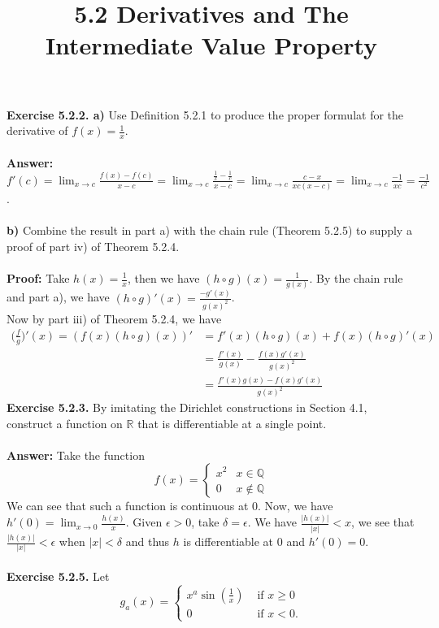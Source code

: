 \documentclass{article}
\title{\textbf{5.2 Derivatives and The Intermediate Value Property}}
\begin{document}
	\maketitle
	\textbf{Exercise 5.2.2. a)} Use Definition 5.2.1 to produce the proper formulat for the derivative of $f(x) = \frac{1}{x}$. \\ \\
	\textbf{Answer:} $f'(c) = \lim_{x \to c} \frac{f(x) - f(c)}{x - c} = \lim_{x \to c} \frac{\frac{1}{x} - \frac{1}{c}}{x - c} = \lim_{x \to c} \frac{c - x}{xc(x - c)} = \lim_{x \to c} \frac{-1}{xc} = \frac{-1}{c^2}$. \\ \\
	\textbf{b)} Combine the result in part a) with the chain rule (Theorem 5.2.5) to supply a proof of part iv) of Theorem 5.2.4. \\ \\
	\textbf{Proof:} Take $h(x) = \frac{1}{x}$, then we have $(h \circ g)(x) = \frac{1}{g(x)}$. By the chain rule and part a), we have $(h \circ g)'(x) = \frac{-g'(x)}{g(x)^2}$. \\
	Now by part iii) of Theorem 5.2.4, we have 
	\begin{align*}
		\big(\frac{f}{g}\big)'(x) =  (f(x)(h \circ g)(x))' &= f'(x)(h \circ g)(x) + f(x)(h \circ g)'(x) \\
								   &= \frac{f'(x)}{g(x)} - \frac{f(x)g'(x)}{g(x)^2} \\
								   &= \frac{f'(x)g(x) - f(x)g'(x)}{g(x)^2}
	\end{align*}
	\textbf{Exercise 5.2.3.} By imitating the Dirichlet constructions in Section 4.1, construct a function on $\mathbb{R}$ that is differentiable at a single point. \\ \\
	\textbf{Answer:} Take the function 
		$$f(x) = \begin{cases}
			x^2 & x \in \mathbb{Q} \\
			0 & x \not \in \mathbb{Q}
		\end{cases}$$
	We can see that such a function is continuous at 0. Now, we have $h'(0) = \lim_{x \to 0} \frac{h(x)}{x}$. Given $\epsilon > 0$, take $\delta = \epsilon$. We have $\frac{|h(x)|}{|x|} < x$, we see that $\frac{|h(x)|}{|x|} < \epsilon$ when $|x| < \delta$ and thus $h$ is differentiable at 0 and $h'(0) = 0$. \\ \\
	\textbf{Exercise 5.2.5.} Let
		$$g_a(x) = \begin{cases}
			x^a\sin(\frac{1}{x}) & \text{ if } x \geq 0 \\
			0 & \text{ if } x < 0.
		\end{cases}$$
\end{document}
